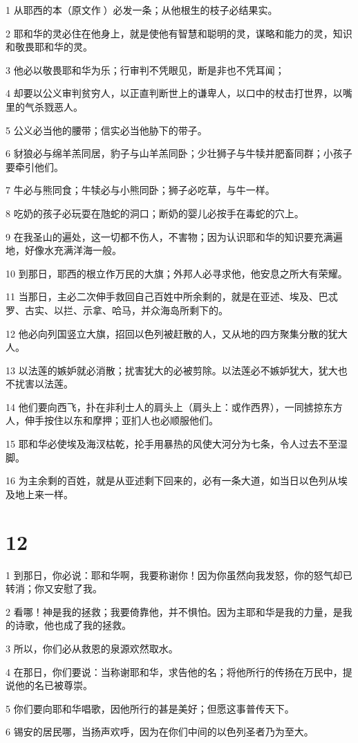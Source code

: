 \par 1 从耶西的本（原文作）必发一条；从他根生的枝子必结果实。
\par 2 耶和华的灵必住在他身上，就是使他有智慧和聪明的灵，谋略和能力的灵，知识和敬畏耶和华的灵。
\par 3 他必以敬畏耶和华为乐；行审判不凭眼见，断是非也不凭耳闻；
\par 4 却要以公义审判贫穷人，以正直判断世上的谦卑人，以口中的杖击打世界，以嘴里的气杀戮恶人。
\par 5 公义必当他的腰带；信实必当他胁下的带子。
\par 6 豺狼必与绵羊羔同居，豹子与山羊羔同卧；少壮狮子与牛犊并肥畜同群；小孩子要牵引他们。
\par 7 牛必与熊同食；牛犊必与小熊同卧；狮子必吃草，与牛一样。
\par 8 吃奶的孩子必玩耍在虺蛇的洞口；断奶的婴儿必按手在毒蛇的穴上。
\par 9 在我圣山的遍处，这一切都不伤人，不害物；因为认识耶和华的知识要充满遍地，好像水充满洋海一般。
\par 10 到那日，耶西的根立作万民的大旗；外邦人必寻求他，他安息之所大有荣耀。
\par 11 当那日，主必二次伸手救回自己百姓中所余剩的，就是在亚述、埃及、巴忒罗、古实、以拦、示拿、哈马，并众海岛所剩下的。
\par 12 他必向列国竖立大旗，招回以色列被赶散的人，又从地的四方聚集分散的犹大人。
\par 13 以法莲的嫉妒就必消散；扰害犹大的必被剪除。以法莲必不嫉妒犹大，犹大也不扰害以法莲。
\par 14 他们要向西飞，扑在非利士人的肩头上（肩头上：或作西界），一同掳掠东方人，伸手按住以东和摩押；亚扪人也必顺服他们。
\par 15 耶和华必使埃及海汊枯乾，抡手用暴热的风使大河分为七条，令人过去不至湿脚。
\par 16 为主余剩的百姓，就是从亚述剩下回来的，必有一条大道，如当日以色列从埃及地上来一样。

\chapter{12}

\par 1 到那日，你必说：耶和华啊，我要称谢你！因为你虽然向我发怒，你的怒气却已转消；你又安慰了我。
\par 2 看哪！神是我的拯救；我要倚靠他，并不惧怕。因为主耶和华是我的力量，是我的诗歌，他也成了我的拯救。
\par 3 所以，你们必从救恩的泉源欢然取水。
\par 4 在那日，你们要说：当称谢耶和华，求告他的名；将他所行的传扬在万民中，提说他的名已被尊崇。
\par 5 你们要向耶和华唱歌，因他所行的甚是美好；但愿这事普传天下。
\par 6 锡安的居民哪，当扬声欢呼，因为在你们中间的以色列圣者乃为至大。

